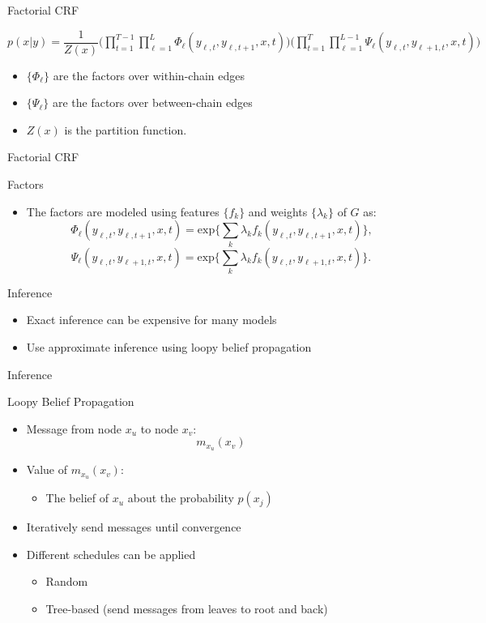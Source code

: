 \documentclass[presentation,bigger]{beamer}
\begin{document}
\begin{frame}[label={sec:orgheadline15}]{Factorial CRF}
\begin{definition}
\(p(x|y) = \dfrac{1}{Z(x)}\Bigg(\displaystyle\prod_{t=1}^{T-1}\prod_{\ell=1}^{L}\Phi_\ell(y_{\ell,t},y_{\ell,t+1},x,t)\Bigg)\Bigg(\prod_{t=1}^{T}\prod_{\ell=1}^{L-1}\Psi_\ell(y_{\ell,t},y_{\ell+1,t},x,t)\Bigg)\)
\begin{itemize}
\item \(\{\Phi_\ell\}\) are the factors over within-chain edges
\item \(\{\Psi_\ell\}\) are the factors over between-chain edges
\item \(Z(x)\) is the partition function.
\end{itemize}
\end{definition}
\end{frame}
\begin{frame}[label={sec:orgheadline16}]{Factorial CRF}
\begin{block}{Factors}
\begin{itemize}
\item The factors are modeled using features \(\{f_k\}\) and weights \(\{\lambda_k\}\) of \(G\) as:
\[\Phi_\ell(y_{\ell,t},y_{\ell,t+1},x,t) = \text{exp}\Bigg\{\sum_k\lambda_k f_k(y_{\ell,t},y_{\ell,t+1},x,t)\Bigg\}\text{,}\]
\[\Psi_\ell(y_{\ell,t},y_{\ell+1,t},x,t) = \text{exp}\Bigg\{\sum_k\lambda_k f_k(y_{\ell,t},y_{\ell+1,t},x,t)\Bigg\}\text{.}\]
\end{itemize}
\end{block}
\end{frame}
\begin{frame}[label={sec:orgheadline17}]{Inference}
\begin{itemize}
\item Exact inference can be expensive for many models
\item Use approximate inference using loopy belief propagation
\end{itemize}
\end{frame}
\begin{frame}[label={sec:orgheadline18}]{Inference}
\begin{block}{Loopy Belief Propagation}
\begin{itemize}
\item Message from node \(x_u\) to node \(x_v\):
\[ m_{x_u}(x_v) \]
\item Value of \(m_{x_u}(x_v)\):
\begin{itemize}
\item The belief of \(x_u\) about the probability \(p(x_j)\)
\end{itemize}
\item Iteratively send messages until convergence
\item Different schedules can be applied
\begin{itemize}
\item Random
\item Tree-based (send messages from leaves to root and back)
\end{itemize}
\end{itemize}
\end{block}
\end{frame}
\end{document}

